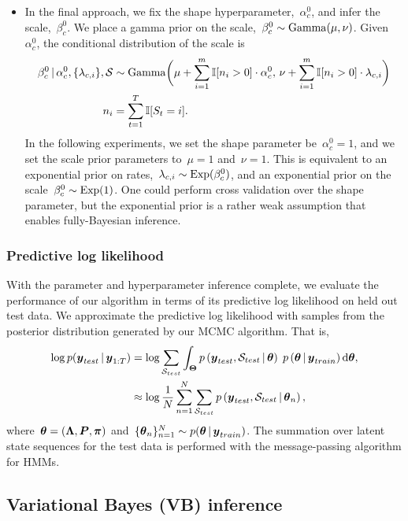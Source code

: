 \begin{itemize}
\item In the final approach, we fix the shape
  hyperparameter,~$\alpha_c^0$, and infer the scale,~$\beta_c^0$.  We
  place a gamma prior on the scale,~$\beta_c^0 \sim \mathrm{Gamma}(\mu,
  \nu)$. Given~$\alpha_c^0$, the conditional distribution of the scale
  is
\begin{align}
\beta_c^0 \,|\, \alpha_c^0, \{\lambda_{c,i}\}, \mathcal{S}  &\sim \mathrm{Gamma}\bigg(
\mu + \sum_{i=1}^m \mathbb{I}[n_i > 0] \cdot \alpha_c^0, \,
\nu + \sum_{i=1}^m \mathbb{I}[n_i > 0] \cdot \lambda_{c,i} \bigg) \\
\nonumber n_i &= \sum_{t=1}^T \mathbb{I}[S_t=i].
\end{align}
In the following experiments, we set the shape parameter
be~$\alpha_c^0=1$, and we set the scale prior parameters to~$\mu=1$
and~$\nu=1$.  This is equivalent to an exponential prior on
rates,~$\lambda_{c,i} \sim \mathrm{Exp}(\beta_c^0)$, and an
exponential prior on the scale~$\beta_c^0 \sim \mathrm{Exp}(1)$.
One could perform cross validation over the shape parameter, but the
exponential prior is a rather weak assumption that enables
fully-Bayesian inference.


\end{itemize}


\subsubsection{Predictive log likelihood}
With the parameter and hyperparameter inference complete, we evaluate
the performance of our algorithm in terms of its predictive log
likelihood on held out test data. We approximate the predictive log
likelihood with samples from the posterior distribution generated by
our MCMC algorithm. That is,
\begin{align}
\log p(\boldsymbol{y}_{test} \,|\, \boldsymbol{y}_{1:T}) &= \log \sum_{\mathcal{S}_{test}} \int_{\boldsymbol{\Theta}} p\left(\boldsymbol{y}_{test}, \mathcal{S}_{test} \,|\, \boldsymbol{\theta} \right) \; p\left(\boldsymbol{\theta} \,|\, \boldsymbol{y}_{train} \right) \mathrm{d}\boldsymbol{\theta}, \\
\nonumber &\approx \log \frac{1}{N} \sum_{n=1}^N \sum_{\mathcal{S}_{test}} p\left(\boldsymbol{y}_{test},  \mathcal{S}_{test} \,|\, \boldsymbol{\theta}_n\right),
\end{align}
where~${\boldsymbol{\theta}=(\boldsymbol{\Lambda}, \boldsymbol{P}, \boldsymbol{\pi})}$ and~$\{\boldsymbol{\theta}_n \}_{n=1}^N
\sim p(\boldsymbol{\theta} \,|\, \boldsymbol{y}_{train})$. The summation over latent state
sequences for the test data is performed with the message-passing
algorithm for HMMs.

\subsection{Variational Bayes (VB) inference}



